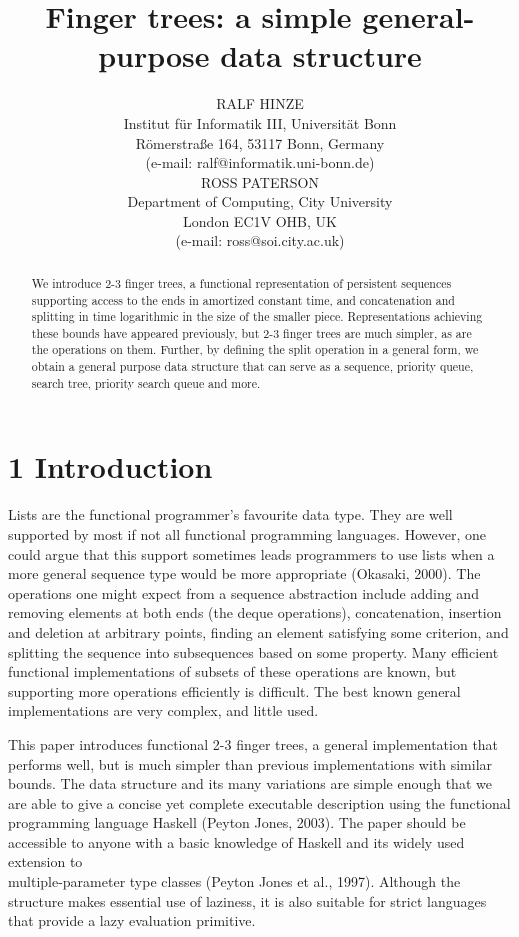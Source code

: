 \documentclass[10pt]{article}
\title{Finger trees: a simple general-purpose data structure }
\author{RALF HINZE\\
Institut für Informatik III, Universität Bonn\\
Römerstraße 164, 53117 Bonn, Germany\\
(e-mail: ralf@informatik.uni-bonn.de)\\
ROSS PATERSON\\
Department of Computing, City University\\
London EC1V OHB, UK\\
(e-mail: ross@soi.city.ac.uk)}
\date{}
\begin{document}
\maketitle


\begin{abstract}
We introduce 2-3 finger trees, a functional representation of persistent sequences supporting access to the ends in amortized constant time, and concatenation and splitting in time logarithmic in the size of the smaller piece. Representations achieving these bounds have appeared previously, but 2-3 finger trees are much simpler, as are the operations on them. Further, by defining the split operation in a general form, we obtain a general purpose data structure that can serve as a sequence, priority queue, search tree, priority search queue and more.
\end{abstract}

\section*{1 Introduction}
Lists are the functional programmer's favourite data type. They are well supported by most if not all functional programming languages. However, one could argue that this support sometimes leads programmers to use lists when a more general sequence type would be more appropriate (Okasaki, 2000). The operations one might expect from a sequence abstraction include adding and removing elements at both ends (the deque operations), concatenation, insertion and deletion at arbitrary points, finding an element satisfying some criterion, and splitting the sequence into subsequences based on some property. Many efficient functional implementations of subsets of these operations are known, but supporting more operations efficiently is difficult. The best known general implementations are very complex, and little used.

This paper introduces functional 2-3 finger trees, a general implementation that performs well, but is much simpler than previous implementations with similar bounds. The data structure and its many variations are simple enough that we are able to give a concise yet complete executable description using the functional programming language Haskell (Peyton Jones, 2003). The paper should be accessible to anyone with a basic knowledge of Haskell and its widely used extension to\\
multiple-parameter type classes (Peyton Jones et al., 1997). Although the structure makes essential use of laziness, it is also suitable for strict languages that provide a lazy evaluation primitive.
\end{document}
